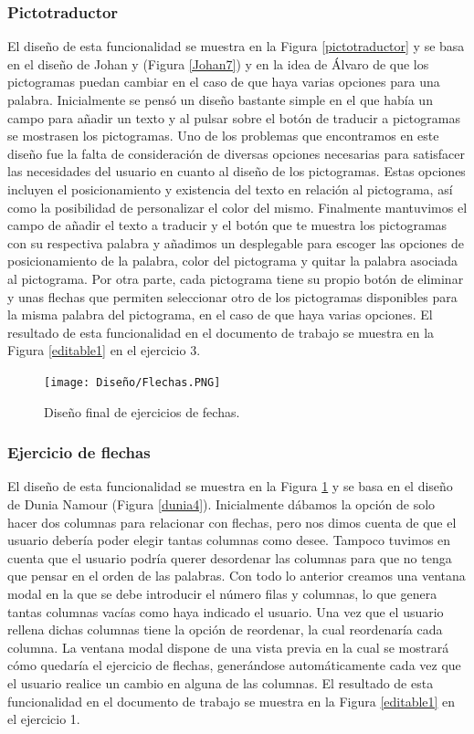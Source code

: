 \subsubsection{Pictotraductor}
El diseño de esta funcionalidad se muestra en la Figura \ref{pictotraductor} y se basa en el diseño de Johan y (Figura \ref{Johan7}) y en la idea de Álvaro de que los pictogramas puedan cambiar en el caso de que haya varias opciones para una palabra. Inicialmente se pensó un diseño bastante simple en el que había un campo para añadir un texto y al pulsar sobre el botón de traducir a pictogramas se mostrasen los pictogramas. Uno de los problemas que encontramos en este diseño fue la falta de consideración de diversas opciones necesarias para satisfacer las necesidades del usuario en cuanto al diseño de los pictogramas. Estas opciones incluyen el posicionamiento y existencia del texto en relación al pictograma, así como la posibilidad de personalizar el color del mismo. Finalmente mantuvimos el campo de añadir el texto a traducir y el botón que te muestra los pictogramas con su respectiva palabra y añadimos un desplegable para escoger las opciones de posicionamiento de la palabra, color del pictograma y quitar la palabra asociada al pictograma. Por otra parte, cada pictograma tiene su propio botón de eliminar y unas flechas que permiten seleccionar otro de los pictogramas disponibles para la misma palabra del pictograma, en el caso de que haya varias opciones. El resultado de esta funcionalidad en el documento de trabajo se muestra en la Figura \ref{editable1} en el ejercicio 3.

\begin{figure}[ht!]
  \centering
  \texttt{[image: Diseño/Flechas.PNG]}
  \caption{Diseño final de ejercicios de fechas.}
  \label{flechas}
\end{figure}

\subsubsection{Ejercicio de flechas}
El diseño de esta funcionalidad se muestra en la Figura \ref{flechas} y se basa en el diseño de Dunia Namour (Figura \ref{dunia4}). Inicialmente dábamos la opción de solo hacer dos columnas para relacionar con flechas, pero nos dimos cuenta de que el usuario debería poder elegir tantas columnas como desee. Tampoco tuvimos en cuenta que el usuario podría querer desordenar las columnas para que no tenga que pensar en el orden de las palabras. Con todo lo anterior creamos una ventana modal en la que se debe introducir el número filas y columnas, lo que genera tantas columnas vacías como haya indicado el usuario. Una vez que el usuario rellena dichas columnas tiene la opción de reordenar, la cual reordenaría cada columna. La ventana modal dispone de una vista previa en la cual se mostrará cómo quedaría el ejercicio de flechas, generándose automáticamente cada vez que el usuario realice un cambio en alguna de las columnas. El resultado de esta funcionalidad en el documento de trabajo se muestra en la Figura \ref{editable1} en el ejercicio 1.


